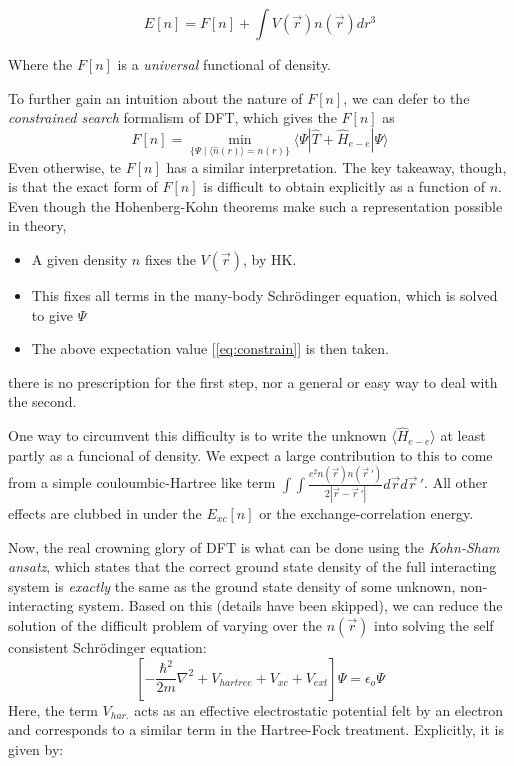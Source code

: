 \message{ !name(dfpt.tex)}\documentclass[]{article}
\begin{document}
        \begin{equation} \label{eq:funcham}
                E[n] = F[n] + \int V(\vec{r}) n(\vec{r}) dr^3
        \end{equation}

        Where the $F[n]$ is a \textit{universal} functional of density.

        To further gain an intuition about the nature of $F[n]$, we can defer to
        the \textit{constrained search} formalism of DFT, which gives the $F[n]$ as
        \begin{equation}\label{eq:constrain}
          F[n] = \min_{\{\Psi \mid \langle\widehat{n}(r)\rangle = n(r)\}}
          \langle \Psi| \widehat{T} + \widehat{H}_{e-e} |\Psi\rangle
        \end{equation}
        Even otherwise, te $F[n]$ has a similar interpretation.
        The key takeaway, though, is that the exact form of $F[n]$ is difficult to obtain
        explicitly as a function of $n$. Even though the Hohenberg-Kohn theorems make
        such a representation possible in theory,
        \begin{itemize}
        \item A given density $n$ fixes the $V(\vec{r})$, by HK.
        \item This fixes all terms in the many-body Schr{\"o}dinger equation, which
          is solved to give $\Psi$
        \item The above expectation value [\ref{eq:constrain}] is then taken.
        \end{itemize}

        there is no prescription for the first step, nor a general or easy way to
        deal with the second.

        One way to circumvent this difficulty is to write the unknown
        $\langle \widehat{H}_{e-e} \rangle$ at least partly as a funcional of density. We
        expect a large contribution to this to come from a simple couloumbic-Hartree
        like term $\int \int \frac{e^2 n(\vec{r}) n({\vec{r}\,}') }{2 |\vec{r}
          - {\vec{r}\,}'|} d\vec{r} d{\vec{r}\,}'$. All other effects are clubbed in under the $E_{xc}[n]$
        or the exchange-correlation energy.

        Now, the real crowning glory of DFT is what can be done using the
        \textit{Kohn-Sham ansatz}, which states that the correct ground state
        density of the full interacting system is \textit{exactly} the same as the
        ground state density of some unknown, non-interacting system. Based on this
        (details have been skipped), we can reduce the solution of the difficult problem
        of varying over the $ n(\vec{r}) $ into solving the self consistent Schr{\"o}dinger
        equation:
        \begin{equation}\label{eq:dft_schrod}
                [-\frac{\hbar^2}{2m}\nabla^2 + V_{hartree} + V_{xc} + V_{ext}]\Psi = \epsilon_o \Psi
        \end{equation}
        Here, the term $ V_{har.} $ acts as an effective electrostatic potential felt
        by an electron and corresponds to a similar term in the Hartree-Fock treatment.
        Explicitly, it is given by:
\end{document}
